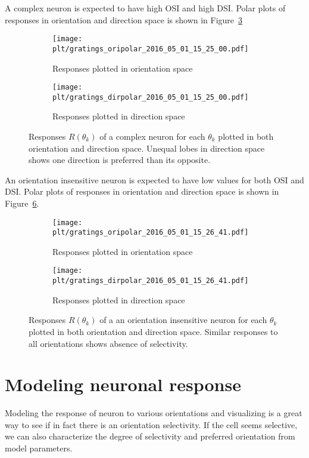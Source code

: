 \documentclass[MTech]{iitmdiss}
\newcommand{\plt}{thesis_plots}
\begin{document}
A complex neuron is expected to have high OSI and high DSI. Polar plots of responses in orientation and direction space is shown in Figure~\ref{fig:oridir_complex}
\begin{figure}[h]
  \begin{subfigure}[b]{0.5\textwidth}
    \texttt{[image: \\plt/gratings\_oripolar\_2016\_05\_01\_15\_25\_00.pdf]}
    \caption{Responses plotted in orientation space}
    \label{fig:ori_complex}
  \end{subfigure}%
  \begin{subfigure}[b]{0.5\textwidth}
    \texttt{[image: \\plt/gratings\_dirpolar\_2016\_05\_01\_15\_25\_00.pdf]}
    \caption{Responses plotted in direction space}
    \label{fig:dir_complex}
  \end{subfigure}%
  \caption{Responses $R(\theta_k)$ of a complex neuron for each $\theta_k$ plotted in both orientation and direction space. Unequal lobes in direction space shows one direction is preferred than its opposite.}\label{fig:oridir_complex}
\end{figure}

An orientation insensitive neuron is expected to have low values for both OSI and DSI. Polar plots of responses in orientation and direction space is shown in Figure~\ref{fig:oridir_unsel}.
\begin{figure}[h]
  \begin{subfigure}[b]{0.5\textwidth}
    \texttt{[image: \\plt/gratings\_oripolar\_2016\_05\_01\_15\_26\_41.pdf]}
    \caption{Responses plotted in orientation space}
    \label{fig:ori_unsel}
  \end{subfigure}%
  \begin{subfigure}[b]{0.5\textwidth}
    \texttt{[image: \\plt/gratings\_dirpolar\_2016\_05\_01\_15\_26\_41.pdf]}
    \caption{Responses plotted in direction space}
    \label{fig:dir_unsel}
  \end{subfigure}%
  \caption{Responses $R(\theta_k)$ of a an orientation insensitive neuron for each $\theta_k$ plotted in both orientation and direction space. Similar responses to all orientations shows absence of selectivity.}\label{fig:oridir_unsel}
\end{figure}

\section{Modeling neuronal response} %
\label{sec:modeling_neuronal_response_to_sinusoidal_gratings_stimuli}
Modeling the response of neuron to various orientations and visualizing is a great way to see if in fact there is an orientation selectivity. If the cell seems selective, we can also characterize the degree of selectivity and preferred orientation from model parameters.
\end{document}
